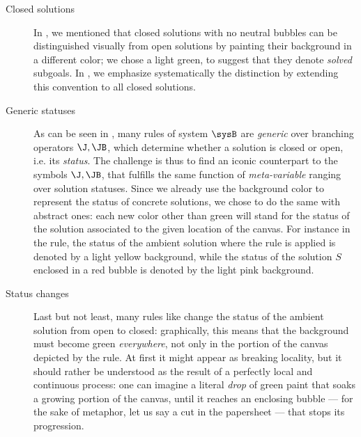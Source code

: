 \begin{description}
  \item[Closed solutions] In , we mentioned that closed
solutions with no neutral bubbles can be distinguished visually from open
solutions by painting their background in a different color; we chose a light
green, to suggest that they denote \emph{solved} subgoals. In
, we emphasize systematically the distinction by extending
this convention to all closed solutions.
  \item[Generic statuses] As can be seen in , many rules of
system $\sysB$ are \emph{generic} over branching operators $\J, \JB$, which
determine whether a solution is closed or open, i.e. its \emph{status}. The
challenge is thus to find an iconic counterpart to the symbols $\J, \JB$, that
fulfills the same function of \emph{meta-variable} ranging over solution
statuses. Since we already use the background color to represent the status of
concrete solutions, we chose to do the same with abstract ones: each new color
other than green will stand for the status of the solution associated to the
given location of the canvas. For instance in the 
rule, the status of the ambient solution where the rule is applied is denoted by
a light yellow background, while the status of the solution $S$ enclosed in a
red bubble is denoted by the light pink background.
  \item[Status changes] Last but not least, many rules like 
change the status of the ambient solution from open to closed: graphically, this
means that the background must become green \emph{everywhere}, not only in the
portion of the canvas depicted by the rule. At first it might appear as breaking
locality, but it should rather be understood as the result of a perfectly local
and continuous process: one can imagine a literal \emph{drop} of green paint
that soaks a growing portion of the canvas, until it reaches an enclosing bubble
--- for the sake of metaphor, let us say a cut in the papersheet --- that stops
its progression.
\end{description}

